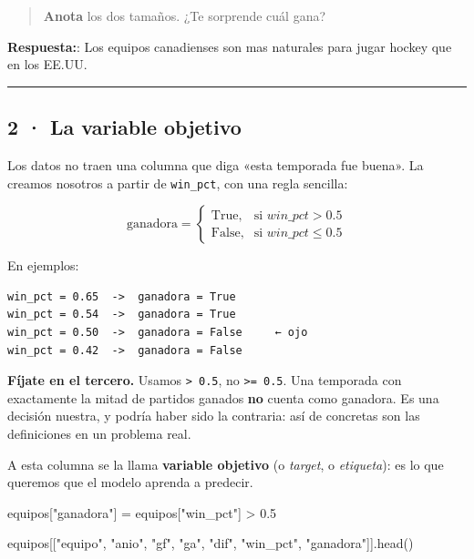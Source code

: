 \documentclass[
]{article}
\newenvironment{Shaded}{}{}
\newcommand{\FloatTok}[1]{\textcolor[rgb]{0.25,0.63,0.44}{#1}}
\newcommand{\NormalTok}[1]{#1}
\newcommand{\OperatorTok}[1]{\textcolor[rgb]{0.40,0.40,0.40}{#1}}
\newcommand{\StringTok}[1]{\textcolor[rgb]{0.25,0.44,0.63}{#1}}
\begin{document}
\protect{}\label{cc48ef23}
\begin{quote}
\textbf{Anota} los dos tamaños. ¿Te sorprende cuál gana?
\end{quote}

\textbf{Respuesta:}: Los equipos canadienses son mas naturales para
jugar hockey que en los EE.UU.

\protect{}\label{f860ece2}
\begin{center}\rule{0.5\linewidth}{0.5pt}\end{center}

\subsection{2 · La variable objetivo}\label{2--la-variable-objetivo}

Los datos no traen una columna que diga «esta temporada fue buena». La
creamos nosotros a partir de \texttt{win\_pct}, con una regla sencilla:

\[
\text{ganadora} =
\begin{cases}
\text{True}, & \text{si } win\_pct > 0.5 \\
\text{False}, & \text{si } win\_pct \le 0.5
\end{cases}
\]

En ejemplos:

\begin{verbatim}
win_pct = 0.65  ->  ganadora = True
win_pct = 0.54  ->  ganadora = True
win_pct = 0.50  ->  ganadora = False     ← ojo
win_pct = 0.42  ->  ganadora = False
\end{verbatim}

\textbf{Fíjate en el tercero.} Usamos \texttt{\textgreater{}\ 0.5}, no
\texttt{\textgreater{}=\ 0.5}. Una temporada con exactamente la mitad de
partidos ganados \textbf{no} cuenta como ganadora. Es una decisión
nuestra, y podría haber sido la contraria: así de concretas son las
definiciones en un problema real.

A esta columna se la llama \textbf{variable objetivo} (o \emph{target},
o \emph{etiqueta}): es lo que queremos que el modelo aprenda a predecir.

\protect{}\label{d6765b21}
\begin{Shaded}
\begin{Highlighting}[]
\NormalTok{equipos[}\StringTok{"ganadora"}\NormalTok{] }\OperatorTok{=}\NormalTok{ equipos[}\StringTok{"win\_pct"}\NormalTok{] }\OperatorTok{\textgreater{}} \FloatTok{0.5}

\NormalTok{equipos[[}\StringTok{"equipo"}\NormalTok{, }\StringTok{"anio"}\NormalTok{, }\StringTok{"gf"}\NormalTok{, }\StringTok{"ga"}\NormalTok{, }\StringTok{"dif"}\NormalTok{, }\StringTok{"win\_pct"}\NormalTok{, }\StringTok{"ganadora"}\NormalTok{]].head()}
\end{Highlighting}
\end{Shaded}
\end{document}
